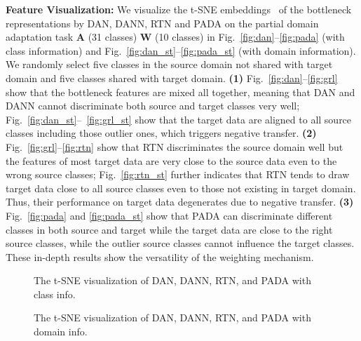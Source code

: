 \documentclass[runningheads]{llncs}
\begin{document}
\textbf{Feature Visualization:} We visualize the t-SNE embeddings~\cite{cite:ICML14DeCAF} of the bottleneck representations by DAN, DANN, RTN and PADA on the partial domain adaptation task \textbf{A} (31 classes)  \textbf{W} (10 classes) in Fig.~\ref{fig:dan}--\ref{fig:pada} (with class information) and Fig.~\ref{fig:dan_st}--\ref{fig:pada_st} (with domain information). We randomly select five classes in the source domain not shared with target domain and five classes shared with target domain. \textbf{(1)} Fig.~\ref{fig:dan}--\ref{fig:grl} show that the bottleneck features are mixed all together, meaning that DAN and DANN cannot discriminate both source and target classes very well; Fig.~\ref{fig:dan_st}--~\ref{fig:grl_st} show that the target data are aligned to all source classes including those outlier ones, which triggers negative transfer. \textbf{(2)} Fig.~\ref{fig:grl}--\ref{fig:rtn} show that RTN discriminates the source domain well but the features of most target data are very close to the source data even to the wrong source classes; Fig.~\ref{fig:rtn_st} further indicates that RTN tends to draw target data close to all source classes even to those not existing in target domain. Thus, their performance on target data degenerates due to negative transfer. 
\textbf{(3)} Fig.~\ref{fig:pada} and \ref{fig:pada_st} show that PADA can discriminate different classes in both source and target while the target data are close to the right source classes, while the outlier source classes cannot influence the target classes. These in-depth results show the versatility of the weighting mechanism. 

\begin{figure}[htbp]
  \centering
  \hfil
  \hfil
  \hfil
  \caption{The t-SNE visualization of DAN, DANN, RTN, and PADA with class info.}
\end{figure}

\begin{figure}[htbp]
  \centering
  \hfil
  \hfil
  \hfil
  \caption{The t-SNE visualization of DAN, DANN, RTN, and PADA with domain info.}
\end{figure}
\end{document}
